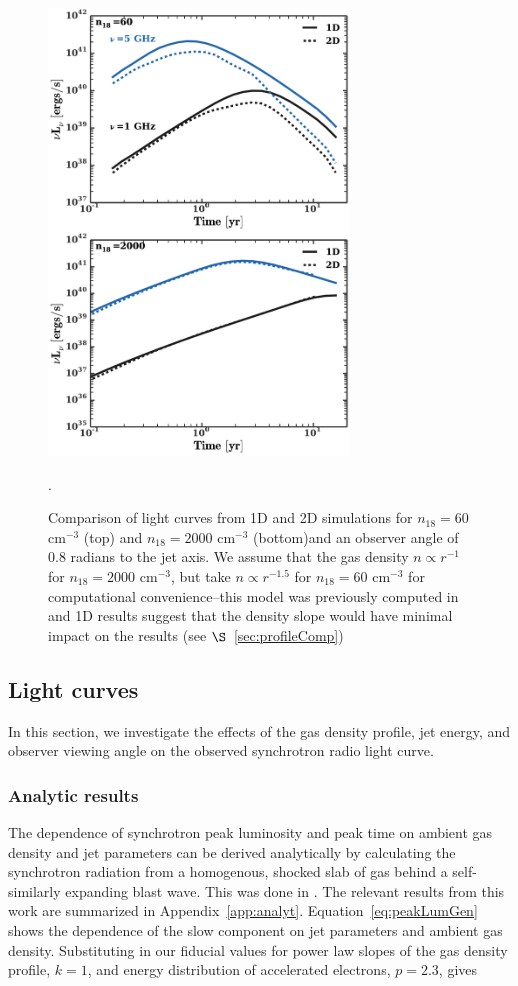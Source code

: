 \documentclass[usenatbib,fleqn]{mnras}
\begin{document}
\begin{figure}
\includegraphics[width=8cm]{1d_2d.pdf}
\caption{\label{fig:1D2DB} Comparison of light curves from 1D and 2D
  simulations for $n_{18}=60$ cm$^{-3}$ (top) and $n_{18}=2000$
  cm$^{-3}$ (bottom)and an observer angle of 0.8 radians to the jet
  axis. We assume that the gas density $n\propto r^{-1}$ for
  $n_{18}=2000$ cm$^{-3}$, but take $n\propto r^{-1.5}$ for
  $n_{18}=60$ cm$^{-3}$ for computational convenience--this model was
  previously computed in \citet{Mimica+2015} and 1D results suggest
  that the density slope would have minimal impact on the results (see
  $\S$~\ref{sec:profileComp})}.
\end{figure}

\subsection{Light curves}
\label{sec:lightcurves}
In this section, we investigate the effects of the gas density
profile, jet energy, and observer viewing angle on the observed
synchrotron radio light curve. 

\subsubsection{Analytic results}
The dependence of synchrotron peak luminosity and peak time on ambient
gas density and jet parameters can be derived analytically by
calculating the synchrotron radiation from a homogenous, shocked slab
of gas behind a self-similarly expanding blast wave. This was done in
\citet{Leventis+2012}. The relevant results from this work are
summarized in Appendix~\ref{app:analyt}. Equation~\ref{eq:peakLumGen}
shows the dependence of the slow component on jet parameters and
ambient gas density. Substituting in our fiducial values for power law
slopes of the gas density profile, $k=1$, and energy distribution of
accelerated electrons, $p=2.3$, gives
\end{document}
